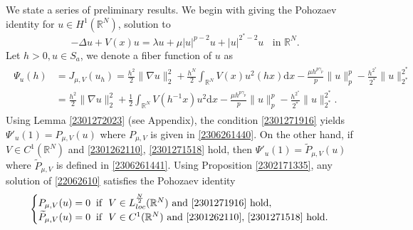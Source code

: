 \documentclass[10pt]{article}
\numberwithin{equation}{section}
\newcommand{\ud}{\mathrm{d}}
\numberwithin{equation}{section}
\begin{document}
We state a series of preliminary results. We begin with giving the Pohozaev identity for $u\in H^1(\mathbb{R}^N)$, solution to
\begin{equation}\label{22062610}
-\Delta u+V(x)u=\lambda u+\mu |u|^{p-2}u+|u|^{2^{*}-2}u \;\;\text { in } \mathbb{R}^N.
\end{equation}
Let $h > 0, u\in S_a$, we denote a fiber function of $u$ as
\begin{align}\label{22072120}
\begin{split}
  \Psi_u(h) &=J_{\mu, V}(u_h)=\frac{h^2}{2}\|\nabla u\|_2^2
+\frac{h^N}{2} \int_{\mathbb{R}^N} V(x)u^2(hx) \ud x-\frac{\mu h^{p\gamma_p }}{p}\|u\|_p^p
-\frac{h^{2^*}}{2^{*}}\|u\|_{2^*}^{2^*}\\
& =\frac{h^{2}}{2}\|\nabla u\|_2^2
+\frac12 \int_{\mathbb{R}^N} V(h^{-1}x)u^2 \ud x-\frac{\mu h^{p\gamma_p }}{p}\|u\|_p^p
-\frac{h^{2^*}}{2^{*}}\|u\|_{2^*}^{2^*}.
\end{split}
\end{align}
Using Lemma \ref{2301272023} (see Appendix), the condition \eqref{2301271916} yields $\Psi'_u(1)={P}_{\mu, V}(u)$ where ${P}_{\mu, V}$ is given in \eqref{2306261440}. On the other hand, if $V\in C^1(\mathbb{R}^N)$ and \eqref{2301262110}, \eqref{2301271518} hold, then
$\Psi'_u(1)=\widetilde{P}_{\mu, V}(u)$ where $\widetilde{P}_{\mu, V}$ is defined in \eqref{2306261441}.
Using Proposition \ref{2302171335}, any solution of \eqref{22062610} satisfies the Pohozaev identity
\begin{equation}\label{2302071001}
\begin{cases}
{P}_{\mu, V}(u)=0\;\; \text{if ~} V\in L_{loc}^{\frac{N}{2}}(\mathbb{R}^N)~\text{and}~\eqref{2301271916}~\text{hold},\\
\widetilde{P}_{\mu, V}(u)=0\;\; \text{if ~} V\in C^1(\mathbb{R}^N) ~\text{and}~\eqref{2301262110},\,\eqref{2301271518}~\text{hold}.
\end{cases}
\end{equation}\par
\end{document}
